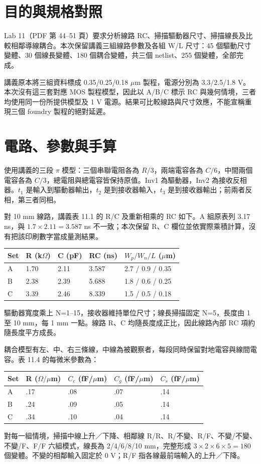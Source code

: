 \section{目的與規格對照}
Lab 11（PDF 第 44--51 頁）要求分析線路 RC、掃描驅動器尺寸、掃描線長及比較相鄰導線耦合。本次保留講義三組線路參數及各組 W/L 尺寸：45 個驅動尺寸變體、30 個線長變體、180 個耦合變體，共三個 netlist、255 個變體，全部完成。

講義原本將三組資料標成 0.35/0.25/0.18 $\mu$m 製程，電源分別為 3.3/2.5/1.8 V。本次沒有這三套對應 MOS 製程模型，因此以 A/B/C 標示 RC 與幾何情境，三者均使用同一份所提供模型及 1 V 電源。結果可比較線路與尺寸效應，不能宣稱重現三個 foundry 製程的絕對延遲。

\section{電路、參數與手算}
使用講義的三段 $\pi$ 模型：三個串聯電阻各為 $R/3$，兩端電容各為 $C/6$，中間兩個電容各為 $C/3$，總電阻與總電容皆保持原值。Inv1 為驅動器，Inv2 為接收反相器。$t_1$ 是輸入到驅動器輸出，$t_2$ 是到接收器輸入，$t_3$ 是到接收器輸出；前兩者反相，第三者同相。

對 10 mm 線路，講義表 11.1 的 R/C 及重新相乘的 RC 如下。A 組原表列 3.17 ns，與 $1.7\times2.11=3.587$ ns 不一致；本次保留 R、C 欄位並依實際乘積計算，沒有把該印刷數字當成量測結果。

\begin{center}\small
\begin{tabular}{lllll}
\toprule
Set & R (k$\Omega$) & C (pF) & RC (ns) & $W_p/W_n/L$ ($\mu$m) \\
\midrule
A & 1.70 & 2.11 & 3.587 & 2.7 / 0.9 / 0.35 \\
B & 2.38 & 2.39 & 5.688 & 1.8 / 0.6 / 0.25 \\
C & 3.39 & 2.46 & 8.339 & 1.5 / 0.5 / 0.18 \\
\bottomrule
\end{tabular}
\end{center}
驅動器寬度乘上 N=1--15，接收器維持單位尺寸；線長掃描固定 N=5，長度由 1 至 10 mm，每 1 mm 一點。線路 R、C 均隨長度成正比，因此線路內部 RC 項約隨長度平方成長。

耦合模型有左、中、右三條線，中線為被觀察者，每段同時保留對地電容與線間電容。表 11.4 的每微米參數為：
\begin{center}\small
\begin{tabular}{lllll}
\toprule
Set & R ($\Omega/\mu$m) & $C_c$ (fF/$\mu$m) & $C_g$ (fF/$\mu$m) & $C_s$ (fF/$\mu$m) \\
\midrule
A & .17 & .08 & .07 & .14 \\
B & .24 & .09 & .05 & .14 \\
C & .34 & .10 & .04 & .14 \\
\bottomrule
\end{tabular}
\end{center}
對每一組情境，掃描中線上升／下降、相鄰線 R/R、R/不變、R/F、不變/不變、不變/F、F/F 六組模式，線長為 2/4/6/8/10 mm，完整形成 $3\times2\times6\times5=180$ 個變體。不變的相鄰輸入固定於 0 V；R/F 指各線最前端輸入的上升／下降。
